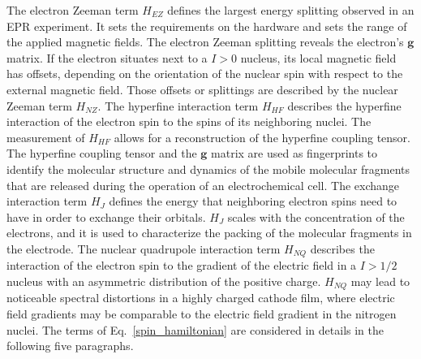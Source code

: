 The electron Zeeman term $H_{EZ}$ defines the largest energy splitting observed in an EPR experiment. It sets the requirements on the hardware and sets the range of the applied magnetic fields. The electron Zeeman splitting reveals the electron's $\textbf{g}$ matrix. If the electron situates next to a $I>0$ nucleus, its local magnetic field has offsets, depending on the orientation of the nuclear spin with respect to the external magnetic field. Those offsets or splittings are described by the nuclear Zeeman term $H_{NZ}$. The hyperfine interaction term $H_{HF}$ describes the hyperfine interaction of the electron spin to the spins of its neighboring nuclei. The measurement of $H_{HF}$ allows for a reconstruction of the hyperfine coupling tensor. The hyperfine coupling tensor and the $\textbf{g}$ matrix are used as fingerprints to identify the molecular structure and dynamics of the mobile molecular fragments that are released during the operation of an electrochemical cell. The exchange interaction term $H_{J}$ defines the energy that neighboring electron spins need to have in order to exchange their orbitals. $H_{J}$ scales with the concentration of the electrons, and it is used to characterize the packing of the molecular fragments in the electrode. The nuclear quadrupole interaction term $H_{NQ}$ describes the interaction of the electron spin to the gradient of the electric field in a $I>1/2$ nucleus with an asymmetric distribution of the positive charge. $H_{NQ}$ may lead to noticeable spectral distortions in a highly charged cathode film, where electric field gradients may be comparable to the electric field gradient in the nitrogen nuclei. The terms of Eq.~\ref{spin_hamiltonian} are considered in details in the following five paragraphs.

